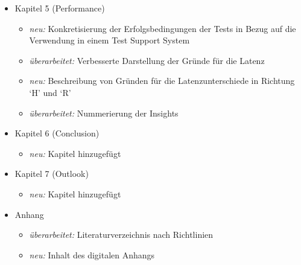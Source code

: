 \begin{itemize}
		\item Kapitel 5 (Performance)
		\begin{itemize}
  			\item \textit{neu:} Konkretisierung der Erfolgsbedingungen der Tests in Bezug auf die Verwendung in einem Test Support System
  			\item \textit{überarbeitet:} Verbesserte Darstellung der Gründe für die Latenz
  			\item \textit{neu:} Beschreibung von Gründen für die Latenzunterschiede in Richtung `H' und `R'
  			\item \textit{überarbeitet:} Nummerierung der Insights
		\end{itemize}
		
		\item Kapitel 6 (Conclusion)
		\begin{itemize}
  			\item \textit{neu:} Kapitel hinzugefügt
		\end{itemize}
		
		\item Kapitel 7 (Outlook)
		\begin{itemize}
  			\item \textit{neu:} Kapitel hinzugefügt
		\end{itemize}
		
		\item Anhang
		\begin{itemize}
  			\item \textit{überarbeitet:} Literaturverzeichnis nach Richtlinien
  			\item \textit{neu:} Inhalt des digitalen Anhangs
		\end{itemize} 
	\end{itemize}
